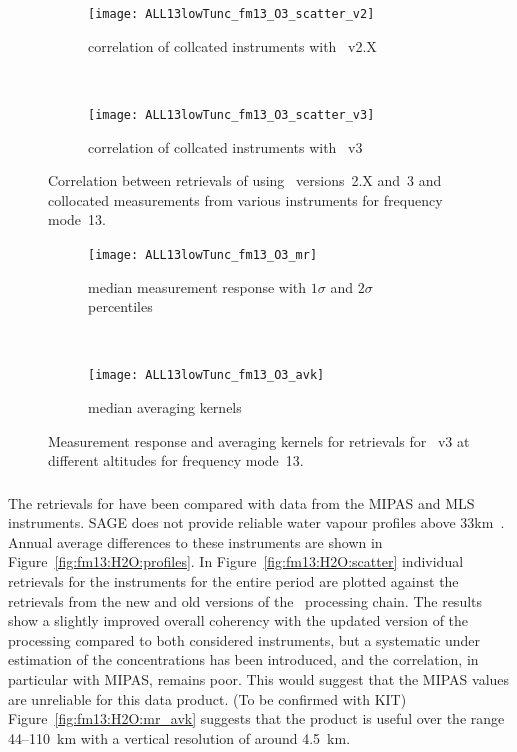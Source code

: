 \begin{figure}[tbhp]
    \centering
    \begin{subfigure}[b]{0.49\textwidth}
        \texttt{[image: ALL13lowTunc\_fm13\_O3\_scatter\_v2]}
        \caption{correlation of collcated instruments with \smr~v2.X}
        \label{fig:fm13:O3:scatter:v2}
    \end{subfigure}
    \,
    \begin{subfigure}[b]{0.49\textwidth}
        \texttt{[image: ALL13lowTunc\_fm13\_O3\_scatter\_v3]}
        \caption{correlation of collcated instruments with \smr~v3}
        \label{fig:fm13:O3:scatter:v3}
    \end{subfigure}
    \caption{Correlation between retrievals of  using \smr\
    versions~2.X and~3 and collocated measurements from various instruments
    for frequency mode~13.}
    \label{fig:fm13:O3:scatter}
\end{figure}

\begin{figure}[tbhp]
    \centering
    \begin{subfigure}[b]{0.49\textwidth}
        \texttt{[image: ALL13lowTunc\_fm13\_O3\_mr]}
        \caption{median measurement response with $1\sigma$ and $2\sigma$
        percentiles}
        \label{fig:fm13:O3:mr}
    \end{subfigure}
    \,
    \begin{subfigure}[b]{0.49\textwidth}
        \texttt{[image: ALL13lowTunc\_fm13\_O3\_avk]}
        \caption{median averaging kernels\newline~}
        \label{fig:fm13:O3:avk}
    \end{subfigure}
    \caption{Measurement response and averaging kernels for 
    retrievals for \smr~v3 at different altitudes for frequency mode~13.}
    \label{fig:fm13:O3:mr_avk}
\end{figure}



\subsubsection{}
\label{sec:fm13:comparison:H2O}
The retrievals for \chem{H_2O} have been compared with data from the MIPAS and
MLS instruments. SAGE does not provide reliable water vapour profiles above
33km~\cite{VDS:2016}. Annual average differences to these instruments are
shown in Figure~\ref{fig:fm13:H2O:profiles}. In
Figure~\ref{fig:fm13:H2O:scatter} individual retrievals for the instruments for
the entire period are plotted against the retrievals from the new and old
versions of the \smr\ processing chain. The results show a slightly improved
overall coherency with the updated version of the processing compared to both
considered instruments, but a systematic under estimation of the concentrations
has been introduced, and the correlation, in particular with MIPAS, remains
poor.  This would suggest that the MIPAS values are  unreliable for this data
product. (To be confirmed with KIT) Figure~\ref{fig:fm13:H2O:mr_avk} suggests
that the product is useful over the range 44--110~km with a vertical resolution
of around 4.5~km.


